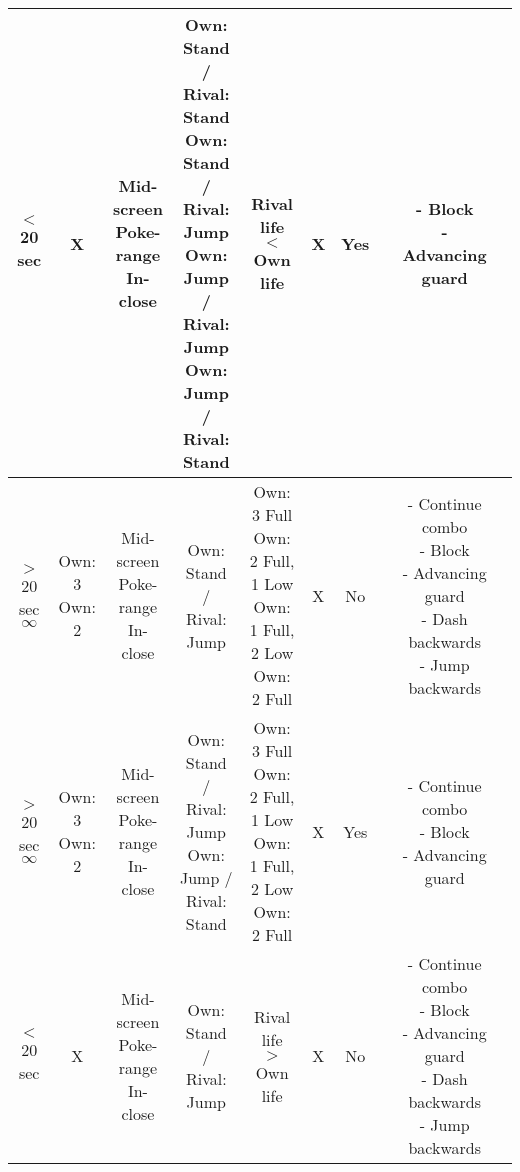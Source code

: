 \documentclass{article}
\begin{document}
\begin{landscape}
\begin{table}[h!]
\begin{center}
\begin{tabular*}{26cm}{c|c|c|c|c|c|c|c|c|c}
      \hline
      $<$ 20 sec & X & \makecell{Mid-screen \\ Poke-range \\ In-close} & \makecell{Own: Stand / Rival: Stand \\ Own: Stand / Rival: Jump \\ Own: Jump / Rival: Jump \\ Own: Jump / Rival: Stand} & Rival life $<$ Own life & X & Yes & & \makecell{- Block \\ - Advancing guard}\\
      \hline
      \makecell{$>$ 20 sec \\ $\infty$} & \makecell {Own: 3 \\ Own: 2} & \makecell{Mid-screen \\ Poke-range \\ In-close} & Own: Stand / Rival: Jump & \makecell {Own: 3 Full \\ Own: 2 Full, 1 Low \\ Own: 1 Full, 2 Low \\ Own: 2 Full} & X & No & & \makecell{- Continue combo \\ - Block \\ - Advancing guard \\ - Dash backwards \\ - Jump backwards}\\
      \hline
      \makecell{$>$ 20 sec \\ $\infty$} & \makecell {Own: 3 \\ Own: 2} & \makecell{Mid-screen \\ Poke-range \\ In-close} & \makecell{Own: Stand / Rival: Jump \\ Own: Jump / Rival: Stand} & \makecell {Own: 3 Full \\ Own: 2 Full, 1 Low \\ Own: 1 Full, 2 Low \\ Own: 2 Full} & X & Yes & & \makecell{- Continue combo \\ - Block \\ - Advancing guard}\\
      \hline
      $<$ 20 sec & X & \makecell{Mid-screen \\ Poke-range \\ In-close} & Own: Stand / Rival: Jump & Rival life $>$ Own life & X & No & & \makecell{- Continue combo \\ - Block \\ - Advancing guard \\ - Dash backwards \\ - Jump backwards}\\

\end{tabular*}
\end{center}
\end{table}
\end{landscape}
\end{document}
